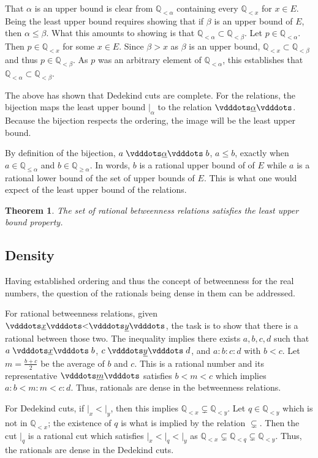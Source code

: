 \documentclass{rmj-public}
\newtheorem{theorem}{Theorem}[section]
\newcommand{\qcut}[2][x]{\ensuremath{\mathbb{Q}_{#2 #1}}}
\newcommand{\qlt}[1][x]{\qcut[#1]{<}}
\newcommand{\qgeq}[1][x]{\qcut[#1]{\geq}}
\newcommand{\qleq}[1][x]{\qcut[#1]{\leq}}
\newcommand{\cut}[1][x]{{\vert}_{#1} }
\newcommand{\yrel}{\xrel[y]}
\begin{document}
That $\alpha$ is an upper bound is clear from $\qlt[\alpha]$ containing every $\qlt$ for $x \in E$. Being the least upper bound requires showing that if $\beta$ is an upper bound of $E$, then $\alpha \leq \beta$. What this amounts to showing is that $\qlt[\alpha] \subset \qlt[\beta]$. Let $p \in \qlt[\alpha]$. Then $p \in \qlt$ for some $x \in E$. Since $\beta > x$ as $\beta$ is an upper bound, $\qlt \subset \qlt[\beta]$ and thus $p \in \qlt[\beta]$. As $p$ was an arbitrary element of $\qlt[\alpha]$, this  establishes that $\qlt[\alpha] \subset \qlt[\beta]$.

The above has shown that Dedekind cuts are complete. For the relations, the bijection  maps the least upper bound $\cut[\alpha]$ to the relation $\xrel[\alpha]$. Because the bijection respects the ordering, the image will be the least upper bound. 

By definition of the bijection, $a \xrel[\alpha] b$, $a \leq b$, exactly when $a \in \qleq [\alpha]$ and $b \in \qgeq[\alpha]$. In words, $b$ is a rational upper bound of of $E$ while $a$ is a rational lower bound of the set of upper bounds of $E$. This is what one would expect of the least upper bound of the relations. 

\begin{theorem}
    The set of rational betweenness relations satisfies the least upper bound property. 
\end{theorem}

\subsection{Density}

Having established ordering and thus the concept of betweenness for the real numbers, the question of the rationals being dense in them can be addressed.

For rational betweenness relations, given $\xrel < \yrel$, the task is to show that there is a rational between those two. The inequality implies there exists $a,b,c,d$ such that $a \xrel b$, $c \xrel[y] d$, and $a:b:c:d$ with $b < c$. Let $m = \frac{b+c}{2}$ be the average of $b$ and $c$. This is a rational number and its representative $\xrel[m]$ satisfies $b < m < c$ which implies $a:b < m:m < c:d$. Thus, rationals are dense in the betweenness relations. 

For Dedekind cuts, if $\cut < \cut[y]$, then this implies $\qlt \subsetneq \qlt[y]$. Let $q \in \qlt[y]$ which is not in $\qlt$; the existence of $q$ is what is implied by the relation $\subsetneq$. Then the cut $\cut[q]$ is a rational cut which satisfies $\cut < \cut[q] < \cut[y]$ as $\qlt \subsetneq \qlt[q] \subsetneq \qlt[y]$.  Thus, the rationals are dense in the Dedekind cuts. 
\end{document}
